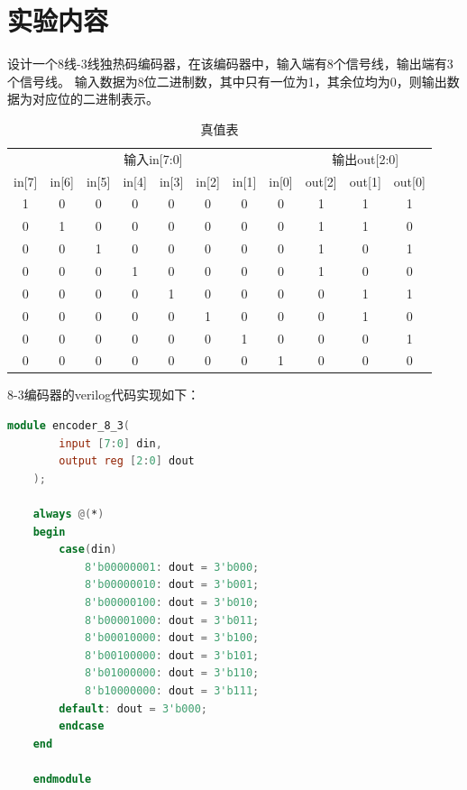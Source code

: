 \documentclass{experiment}
\begin{document}
	\section{实验内容}
	
	设计一个8线-3线独热码编码器，在该编码器中，输入端有8个信号线，输出端有3个信号线。
	输入数据为8位二进制数，其中只有一位为1，其余位均为0，则输出数据为对应位的二进制表示。
	

	\begin{table}[htbp]
		\centering
		\caption{真值表}
		\begin{tabular}{cccccccc|ccc}
			\toprule
			\multicolumn{8}{c|}{输入in[7:0]} & \multicolumn{3}{c}{输出out[2:0]} \\
			\cmidrule{1-8}\cmidrule{9-11} in[7] & in[6] & in[5] & in[4] & in[3] & in[2] & in[1] & in[0] & out[2] & out[1] & out[0] \\
			\midrule
			1 & 0 & 0 & 0 & 0 & 0 & 0 & 0 & 1 & 1 & 1 \\
			0 & 1 & 0 & 0 & 0 & 0 & 0 & 0 & 1 & 1 & 0 \\
			0 & 0 & 1 & 0 & 0 & 0 & 0 & 0 & 1 & 0 & 1 \\
			0 & 0 & 0 & 1 & 0 & 0 & 0 & 0 & 1 & 0 & 0 \\
			0 & 0 & 0 & 0 & 1 & 0 & 0 & 0 & 0 & 1 & 1 \\
			0 & 0 & 0 & 0 & 0 & 1 & 0 & 0 & 0 & 1 & 0 \\
			0 & 0 & 0 & 0 & 0 & 0 & 1 & 0 & 0 & 0 & 1 \\
			0 & 0 & 0 & 0 & 0 & 0 & 0 & 1 & 0 & 0 & 0 \\
			\bottomrule
		\end{tabular}%
		\label{tab:addlabel}%
	\end{table}%

	8-3编码器的verilog代码实现如下：
\begin{lstlisting}[language=verilog]
	module encoder_8_3(
		input [7:0] din,
		output reg [2:0] dout
	);
	
	always @(*)
	begin
		case(din)
			8'b00000001: dout = 3'b000;
			8'b00000010: dout = 3'b001;
			8'b00000100: dout = 3'b010;
			8'b00001000: dout = 3'b011;
			8'b00010000: dout = 3'b100;
			8'b00100000: dout = 3'b101;
			8'b01000000: dout = 3'b110;
			8'b10000000: dout = 3'b111;
		default: dout = 3'b000;
		endcase
	end
	
	endmodule
\end{lstlisting}
\end{document}
